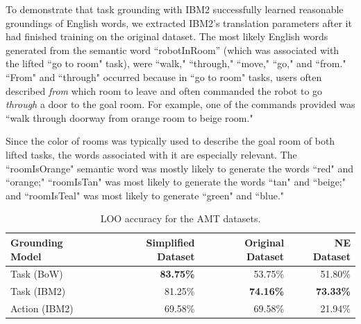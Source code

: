 \documentclass[conference]{IEEEtran}
\begin{document}

To demonstrate that task grounding with IBM2 successfully learned reasonable groundings of English words, we extracted IBM2's translation parameters after it had finished training on the original dataset. The most likely English words generated from the semantic word ``robotInRoom'' (which was associated with the lifted ``go to room" task), were ``walk," ``through," ``move," ``go," and ``from."  ``From" and ``through" occurred because in ``go to room" tasks, users often described {\em from} which room to leave and often commanded the robot to go {\em through} a door to the goal room. For example, one of the commands provided was ``walk through doorway from orange room to beige room."


Since the color of rooms was typically used to describe the goal room of both lifted tasks, the words associated with it are especially relevant. The ``roomIsOrange" semantic word was mostly likely to generate the words ``red" and ``orange;" ``roomIsTan" was most likely to generate the words ``tan" and ``beige;" and ``roomIsTeal" was most likely to generate ``green" and ``blue."



\begin{table}[tb]
\begin{center}
\begin{tabular}{@{}lrrr@{}} \toprule
Grounding Model & Simplified Dataset & Original Dataset & NE Dataset \\ \midrule
 Task (BoW) & {\bf 83.75\%} & 53.75\% & 51.80\%\\ 
 Task (IBM2) & 81.25\% & {\bf 74.16\%} & {\bf 73.33\%} \\ 
 Action (IBM2) & 69.58\% & 69.58\% & 21.94\% \\\bottomrule
\hline
 \end{tabular} 
 \caption{LOO accuracy for the AMT datasets.}
 \label{tab:res}
\end{center}
\end{table}
\end{document}
